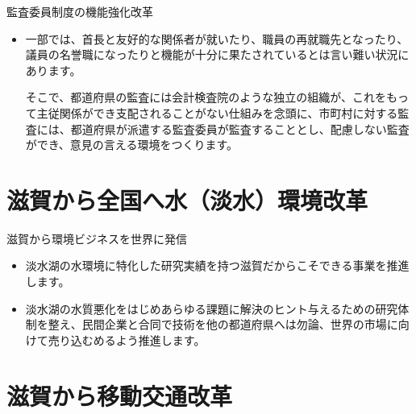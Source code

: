 \documentclass[dvipdfmx]{beamer}
\begin{document}
    \begin{frame}{監査委員制度の機能強化改革}{}
        \begin{small}
            \begin{itemize}
                \setlength{\parsep}{.5mm}
                \setlength{\itemsep}{2mm}
                \item 一部では、首長と友好的な関係者が就いたり、職員の再就職先となったり、議員の名誉職になったりと機能が十分に果たされているとは言い難い状況にあります。\par
                そこで、都道府県の監査には会計検査院のような独立の組織が、これをもって主従関係ができ支配されることがない仕組みを念頭に、市町村に対する監査には、都道府県が派遣する監査委員が監査することとし、配慮しない監査ができ、意見の言える環境をつくります。
            \end{itemize}
        \end{small}
    \end{frame}

\section{滋賀から全国へ水（淡水）環境改革}
    \begin{frame}{}{}
        \sectionpage
    \end{frame}
    
    \begin{frame}{滋賀から環境ビジネスを世界に発信}{}
        \begin{small}
            \begin{itemize}
                \setlength{\parsep}{.5mm}
                \setlength{\itemsep}{2mm}
                \item 淡水湖の水環境に特化した研究実績を持つ滋賀だからこそできる事業を推進します。
                \item 淡水湖の水質悪化をはじめあらゆる課題に解決のヒント与えるための研究体制を整え、民間企業と合同で技術を他の都道府県へは勿論、世界の市場に向けて売り込むめるよう推進します。
            \end{itemize}
        \end{small}
    \end{frame}

\section{滋賀から移動交通改革}
    \begin{frame}{}{}
        \sectionpage
    \end{frame}
    
\end{document}
